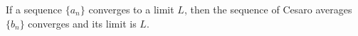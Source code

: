If a sequence $\{a_n\}$ converges to a limit $L$, then the sequence of Cesaro averages $\{b_n\}$ converges and its limit is $L$.

